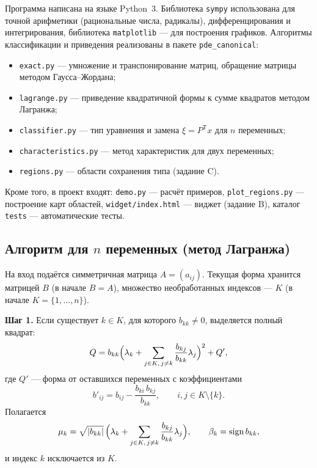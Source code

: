 \documentclass[a4paper,12pt]{article}
\DeclareMathOperator{\sgn}{sign}
\begin{document}
Программа написана на языке Python~3. Библиотека \texttt{sympy} использована для
точной арифметики (рациональные числа, радикалы), дифференцирования и
интегрирования, библиотека \texttt{matplotlib} --- для построения графиков.
Алгоритмы классификации и приведения реализованы в пакете
\texttt{pde\_canonical}:
\begin{itemize}
  \item \texttt{exact.py} --- умножение и транспонирование матриц, обращение матрицы
        методом Гаусса--Жордана;
  \item \texttt{lagrange.py} --- приведение квадратичной формы к сумме квадратов
        методом Лагранжа;
  \item \texttt{classifier.py} --- тип уравнения и замена $\xi=P^{\mathsf T}x$
        для $n$ переменных;
  \item \texttt{characteristics.py} --- метод характеристик для двух переменных;
  \item \texttt{regions.py} --- области сохранения типа (задание C).
\end{itemize}
Кроме того, в проект входят: \texttt{demo.py} --- расчёт примеров,
\texttt{plot\_regions.py} --- построение карт областей,
\texttt{widget/index.html} --- виджет (задание B), каталог \texttt{tests} ---
автоматические тесты.

\subsection{Алгоритм для \texorpdfstring{$n$}{n} переменных (метод Лагранжа)}

На вход подаётся симметричная матрица $A=(a_{ij})$. Текущая форма хранится
матрицей $B$ (в начале $B=A$), множество необработанных индексов --- $K$
(в начале $K=\{1,\dots,n\}$).

\textbf{Шаг 1.} Если существует $k\in K$, для которого $b_{kk}\neq0$, выделяется
полный квадрат:
\begin{equation}\label{eq:square}
  Q=b_{kk}\Bigl(\lambda_k+\sum_{j\in K,\,j\neq k}\frac{b_{kj}}{b_{kk}}\lambda_j\Bigr)^{2}+Q',
\end{equation}
где $Q'$ --- форма от оставшихся переменных с коэффициентами
\begin{equation}\label{eq:schur}
  b'_{ij}=b_{ij}-\frac{b_{ki}\,b_{kj}}{b_{kk}},\qquad i,j\in K\setminus\{k\}.
\end{equation}
Полагается
\[
  \mu_k=\sqrt{|b_{kk}|}\,\Bigl(\lambda_k+\sum_{j\in K,\,j\neq k}\frac{b_{kj}}{b_{kk}}\lambda_j\Bigr),
  \qquad \beta_k=\sgn b_{kk},
\]
и индекс $k$ исключается из $K$.
\end{document}
